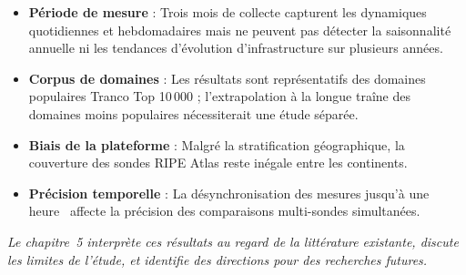 \begin{itemize}
  \item \textbf{Période de mesure} : Trois mois de collecte capturent les dynamiques quotidiennes et hebdomadaires mais ne peuvent pas détecter la saisonnalité annuelle ni les tendances d'évolution d'infrastructure sur plusieurs années.
  \item \textbf{Corpus de domaines} : Les résultats sont représentatifs des domaines populaires Tranco Top 10\,000 ; l'extrapolation à la longue traîne des domaines moins populaires nécessiterait une étude séparée.
  \item \textbf{Biais de la plateforme} : Malgré la stratification géographique, la couverture des sondes RIPE Atlas reste inégale entre les continents.
  \item \textbf{Précision temporelle} : La désynchronisation des mesures jusqu'à une heure~\cite{Holterbach2015} affecte la précision des comparaisons multi-sondes simultanées.
\end{itemize}
\bigskip
\textit{Le chapitre~5 interprète ces résultats au regard de la littérature existante, discute les limites de l'étude, et identifie des directions pour des recherches futures.}
